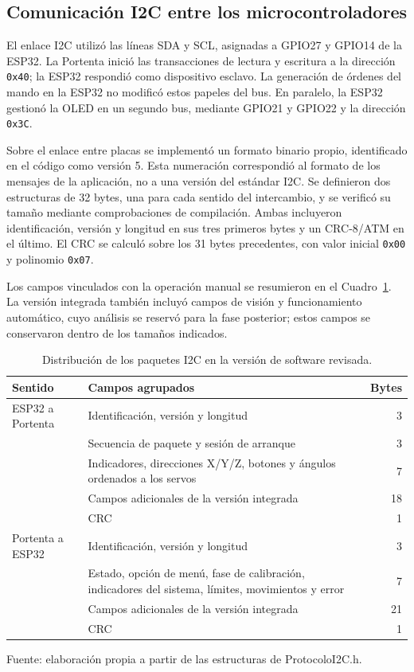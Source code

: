 \subsection{Comunicación I2C entre los microcontroladores}

El enlace I2C utilizó las líneas SDA y SCL, asignadas a GPIO27 y GPIO14 de la ESP32. La Portenta inició las transacciones de lectura y escritura a la dirección \texttt{0x40}; la ESP32 respondió como dispositivo esclavo. La generación de órdenes del mando en la ESP32 no modificó estos papeles del bus. En paralelo, la ESP32 gestionó la OLED en un segundo bus, mediante GPIO21 y GPIO22 y la dirección \texttt{0x3C}.

Sobre el enlace entre placas se implementó un formato binario propio, identificado en el código como versión 5. Esta numeración correspondió al formato de los mensajes de la aplicación, no a una versión del estándar I2C. Se definieron dos estructuras de 32 bytes, una para cada sentido del intercambio, y se verificó su tamaño mediante comprobaciones de compilación. Ambas incluyeron identificación, versión y longitud en sus tres primeros bytes y un CRC-8/ATM en el último. El CRC se calculó sobre los 31 bytes precedentes, con valor inicial \texttt{0x00} y polinomio \texttt{0x07}.

Los campos vinculados con la operación manual se resumieron en el Cuadro~\ref{tab:fase4_paquetes}. La versión integrada también incluyó campos de visión y funcionamiento automático, cuyo análisis se reservó para la fase posterior; estos campos se conservaron dentro de los tamaños indicados.

\begin{table}[H]
    \centering
    \caption{Distribución de los paquetes I2C en la versión de software revisada.}
    \label{tab:fase4_paquetes}
    \begin{tabular}{p{}p{}r}
        \hline
        Sentido & Campos agrupados & Bytes \\
        \hline
        ESP32 a Portenta & Identificación, versión y longitud & 3 \\
        & Secuencia de paquete y sesión de arranque & 3 \\
        & Indicadores, direcciones X/Y/Z, botones y ángulos ordenados a los servos & 7 \\
        & Campos adicionales de la versión integrada & 18 \\
        & CRC & 1 \\
        \hline
        Portenta a ESP32 & Identificación, versión y longitud & 3 \\
        & Estado, opción de menú, fase de calibración, indicadores del sistema, límites, movimientos y error & 7 \\
        & Campos adicionales de la versión integrada & 21 \\
        & CRC & 1 \\
        \hline
    \end{tabular}
    \par\small\raggedright Fuente: elaboración propia a partir de las estructuras de ProtocoloI2C.h.
\end{table}

